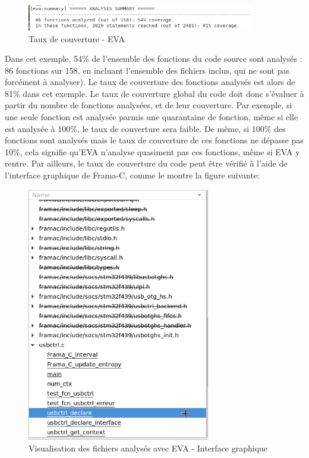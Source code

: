 \begin{figure}[!h]
\centering
\includegraphics[width=10cm]{images/taux_couverture_eva.png}
\caption{Taux de couverture - EVA}
\label{Taux de couverture - EVA}
\end{figure}

\noindent Dans cet exemple, 54\% de l'ensemble des fonctions du code source sont analysés : 86 fonctions sur 158, en incluant l'ensemble des fichiers inclus, qui ne sont pas forcément à analyser). Le taux de couverture des fonctions analysés est alors de 81\% dans cet exemple. Le taux de couverture global du code doit donc s'évaluer à partir du nombre de fonctions analysées, et de leur couverture. Par exemple, si une seule fonction est analysée parmis une quarantaine de fonction, même si elle est analysée à 100\%, le taux de couverture sera faible. De même, si 100\% des fonctions sont analysés mais le taux de couverture de ces fonctions ne dépasse pas 10\%, cela signifie qu'EVA n'analyse quasiment pas ces fonctions, même si EVA y rentre.
\newpage \noindent Par ailleurs, le taux de couverture du code peut être vérifié à l'aide de l'interface graphique de Frama-C, comme le montre la figure suivante:


\begin{figure}[!h]
\centering
\includegraphics[width=8cm]{images/taux_couverture_eva_GUI.png}
\caption{Visualisation des fichiers analysés avec EVA - Interface graphique}
\label{Visualisation des fichiers analysés avec EVA - Interface graphique}
\end{figure}

